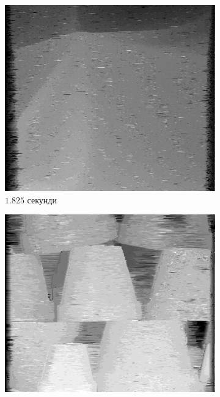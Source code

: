 \begin{figure}[h]
\centering
    \begin{subfigure}[t]{0.32\textwidth}
        \centering
        \includegraphics[width=\textwidth]{images/cloth_dynamic_result}
        \caption{$1.825$ секунди}
        \label{fig:cloth:result:dynamic}
    \end{subfigure}
    \hfill
    \begin{subfigure}[t]{0.32\textwidth}
        \centering
        \includegraphics[width=\textwidth]{images/pots_dynamic_result}

\end{subfigure}
\end{figure}
